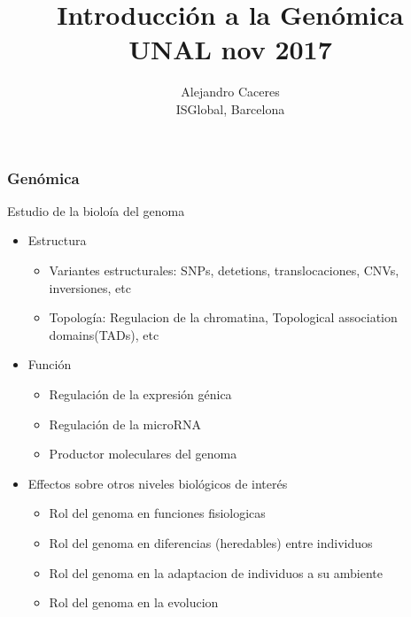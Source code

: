 \documentclass{beamer}\usepackage[]{graphicx}\usepackage[]{color}
\begin{document}

\title{Introducci\'on a la Gen\'omica \\ UNAL nov 2017}
\author{Alejandro Caceres \\ ISGlobal, Barcelona}


\maketitle


\begin{frame}[fragile]
\frametitle{Gen\'omica}

Estudio de la biolo\'ia del genoma
\begin{itemize}
\item Estructura
   \begin{itemize}
     \item Variantes estructurales: SNPs, detetions, translocaciones, CNVs, inversiones, etc
     \item Topología: Regulacion de la chromatina, Topological association domains(TADs), etc
   \end{itemize}
\item Funci\'on
   \begin{itemize}
      \item Regulaci\'on de la expresi\'on g\'enica
      \item Regulaci\'on de la microRNA
      \item Productor moleculares del genoma
   \end{itemize}
\item Effectos sobre otros niveles biol\'ogicos de inter\'es
   \begin{itemize}
     \item Rol del genoma en funciones fisiologicas
     \item Rol del genoma en diferencias (heredables) entre individuos 
     \item Rol del genoma en la adaptacion de individuos a su ambiente
     \item Rol del genoma en la evolucion
   \end{itemize}
\end{itemize}
\end{frame}
\end{document}

